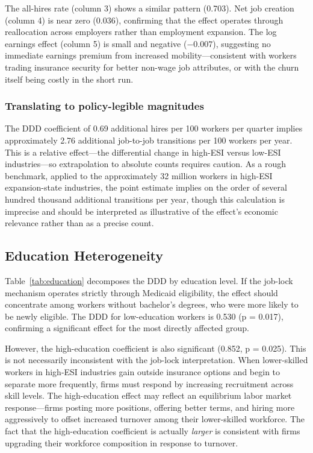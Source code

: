 \documentclass[12pt]{article}
\begin{document}
The all-hires rate (column 3) shows a similar pattern (0.703). Net job creation (column 4) is near zero (0.036), confirming that the effect operates through reallocation across employers rather than employment expansion. The log earnings effect (column 5) is small and negative ($-0.007$), suggesting no immediate earnings premium from increased mobility---consistent with workers trading insurance security for better non-wage job attributes, or with the churn itself being costly in the short run.

\subsubsection*{Translating to policy-legible magnitudes} The DDD coefficient of 0.69 additional hires per 100 workers per quarter implies approximately 2.76 additional job-to-job transitions per 100 workers per year. This is a relative effect---the differential change in high-ESI versus low-ESI industries---so extrapolation to absolute counts requires caution. As a rough benchmark, applied to the approximately 32 million workers in high-ESI expansion-state industries, the point estimate implies on the order of several hundred thousand additional transitions per year, though this calculation is imprecise and should be interpreted as illustrative of the effect's economic relevance rather than as a precise count.

\subsection{Education Heterogeneity}

{\small}

Table~\ref{tab:education} decomposes the DDD by education level. If the job-lock mechanism operates strictly through Medicaid eligibility, the effect should concentrate among workers without bachelor's degrees, who were more likely to be newly eligible. The DDD for low-education workers is 0.530 (p = 0.017), confirming a significant effect for the most directly affected group.

However, the high-education coefficient is also significant (0.852, p = 0.025). This is not necessarily inconsistent with the job-lock interpretation. When lower-skilled workers in high-ESI industries gain outside insurance options and begin to separate more frequently, firms must respond by increasing recruitment across skill levels. The high-education effect may reflect an equilibrium labor market response---firms posting more positions, offering better terms, and hiring more aggressively to offset increased turnover among their lower-skilled workforce. The fact that the high-education coefficient is actually \textit{larger} is consistent with firms upgrading their workforce composition in response to turnover.
\end{document}
